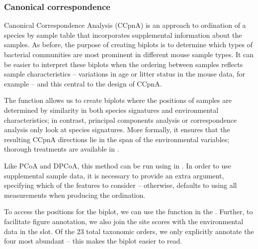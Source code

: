 \subsubsection*{Canonical correspondence}

Canonical Correspondence Analysis (CCpnA) is an approach to ordination
of a species by sample table that incorporates supplemental
information about the samples. As before, the purpose of creating
biplots is to determine which types of bacterial communities are most
prominent in different mouse sample types. It can be easier to
interpret these biplots when the ordering between samples reflects
sample characteristics -- variations in age or litter status in the
mouse data, for example -- and this central to the design of CCpnA.

The function allows us to create biplots where the positions of samples are determined by
similarity in both species signatures and environmental
characteristics; in contrast, principal components analysis or
correspondence analysis only look at species signatures. More
formally, it ensures that the resulting CCpnA directions lie in the
span of the environmental variables; thorough treatments are available
in \cite{terBraak:1985, greenacre2007correspondence}.

Like PCoA and DPCoA, this method can be run using
 in . In order to use
supplemental sample data, it is necessary to provide an extra
argument, specifying which of the features to consider -- otherwise,
 defaults to using all  
measurements when producing the ordination.

\begin{knitrout}
\color{fgcolor}\begin{kframe}
\begin{alltt}
 \hlkwb{<-}  \hlstd{,}   \hlopt{~}  \hlopt{+} 
\end{alltt}
\end{kframe}
\end{knitrout}

To access the positions for the biplot, we can use the
 function in the . Further, to
facilitate figure annotation, we also join the site scores with the
environmental data in the  slot. Of the 23 total
taxonomic orders, we only explicitly annotate the four most abundant
-- this makes the biplot easier to read.

